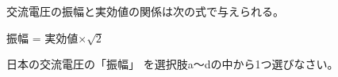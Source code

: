 交流電圧の振幅と実効値の関係は次の式で与えられる。

\begin{center}
振幅 = 実効値$\times \sqrt{2}$
\end{center}

日本の交流電圧の「振幅」 を選択肢a〜dの中から1つ選びなさい。
